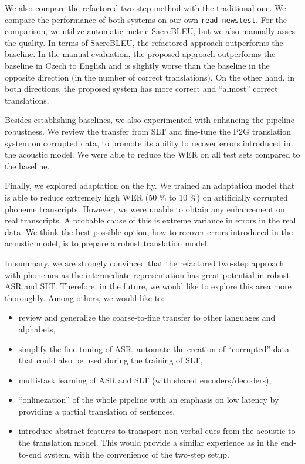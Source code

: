 We also compare the refactored two-step method with the traditional one. We compare the performance of both systems on our own \texttt{read-newstest}. For the comparison, we utilize automatic metric SacreBLEU, but we also manually asses the quality. In terms of SacreBLEU, the refactored approach outperforms the baseline. In the manual evaluation, the proposed approach outperforms the baseline in Czech to English and is slightly worse than the baseline in the opposite direction (in the number of correct translations). On the other hand, in both directions, the proposed system has more correct and ``almost'' correct translations.

Besides establishing baselines, we also experimented with enhancing the pipeline robustness. We review the transfer from SLT and fine-tune the P2G translation system on corrupted data, to promote its ability to recover errors introduced in the acoustic model. We were able to reduce the WER on all test sets compared to the baseline.

Finally, we explored adaptation on the fly. We trained an adaptation model that is able to reduce extremely high WER (50 \% to 10 \%) on artificially corrupted phoneme transcripts. However, we were unable to obtain any enhancement on real transcripts. A probable cause of this is extreme variance in errors in the real data. We think the best possible option, how to recover errors introduced in the acoustic model, is to prepare a robust translation model. 

In summary, we are strongly convinced that the refactored two-step approach with phonemes as the intermediate representation has great potential in robust ASR and SLT. Therefore, in the future, we would like to explore this area more thoroughly. Among others, we would like to:

\begin{itemize}
	\item review and generalize the coarse-to-fine transfer to other languages and alphabets,
	\item simplify the fine-tuning of ASR, automate the creation of ``corrupted'' data that could also be used during the training of SLT,
	\item multi-task learning of ASR and SLT (with shared encoders/decoders),
	\item ``onlinezation'' of the whole pipeline with an emphasis on low latency by providing a partial translation of sentences,
	\item introduce abstract features to transport non-verbal cues from the acoustic to the translation model. This would provide a similar experience as in the end-to-end system, with the convenience of the two-step setup.
\end{itemize}